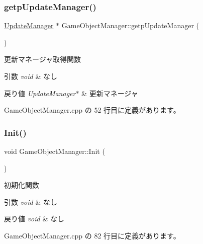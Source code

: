 \subsubsection{\texorpdfstring{getp\+Update\+Manager()}{getpUpdateManager()}}
{\footnotesize\ttfamily \mbox{\hyperlink{class_update_manager}{Update\+Manager}} $\ast$ Game\+Object\+Manager\+::getp\+Update\+Manager (\begin{DoxyParamCaption}{ }\end{DoxyParamCaption})}



更新マネージャ取得関数 


\begin{DoxyParams}{引数}
{\em void} & なし \\
\hline
\end{DoxyParams}

\begin{DoxyRetVals}{戻り値}
{\em Update\+Manager$\ast$} & 更新マネージャ \\
\hline
\end{DoxyRetVals}


 Game\+Object\+Manager.\+cpp の 52 行目に定義があります。

\mbox{\label{class_game_object_manager_abda84aa3b4c79090c43243f93b5a9c46}} 
\subsubsection{\texorpdfstring{Init()}{Init()}}
{\footnotesize\ttfamily void Game\+Object\+Manager\+::\+Init (\begin{DoxyParamCaption}{ }\end{DoxyParamCaption})}



初期化関数 


\begin{DoxyParams}{引数}
{\em void} & なし \\
\hline
\end{DoxyParams}

\begin{DoxyRetVals}{戻り値}
{\em void} & なし \\
\hline
\end{DoxyRetVals}


 Game\+Object\+Manager.\+cpp の 82 行目に定義があります。

